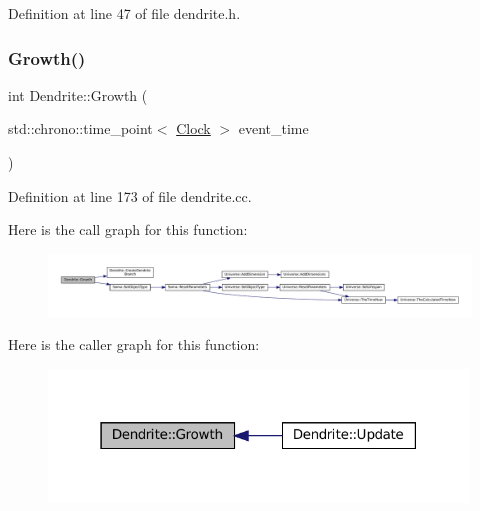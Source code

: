 Definition at line 47 of file dendrite.\+h.

\mbox{\label{class_dendrite_a6a0c08a642c92d8e189e1f7eff6f6b00}} 
\subsubsection{\texorpdfstring{Growth()}{Growth()}}
{\footnotesize\ttfamily int Dendrite\+::\+Growth (\begin{DoxyParamCaption}\item[{std\+::chrono\+::time\+\_\+point$<$ \mbox{\hyperlink{universe_8h_a0ef8d951d1ca5ab3cfaf7ab4c7a6fd80}{Clock}} $>$}]{event\+\_\+time }\end{DoxyParamCaption})}



Definition at line 173 of file dendrite.\+cc.

Here is the call graph for this function\+:\nopagebreak
\begin{figure}[H]
\begin{center}
\leavevmode
\includegraphics[width=350pt]{class_dendrite_a6a0c08a642c92d8e189e1f7eff6f6b00_cgraph}
\end{center}
\end{figure}
Here is the caller graph for this function\+:\nopagebreak
\begin{figure}[H]
\begin{center}
\leavevmode
\includegraphics[width=316pt]{class_dendrite_a6a0c08a642c92d8e189e1f7eff6f6b00_icgraph}
\end{center}
\end{figure}
\mbox{\label{class_dendrite_aa23bd0ce7c5a0a9011b28234cc2e90e1}} 
